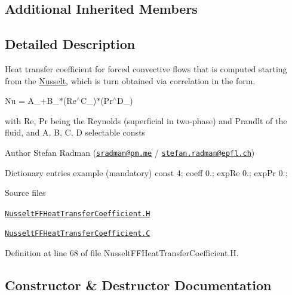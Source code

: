 \subsection*{Additional Inherited Members}


\subsection{Detailed Description}
Heat transfer coefficient for forced convective flows that is computed starting from the \hyperlink{classFoam_1_1FFHeatTransferCoefficientModels_1_1Nusselt}{Nusselt}, which is turn obtained via correlation in the form. 

\label{_Description}%
 Nu = A\+\_\++\+B\+\_\+$\ast$(Re$^\wedge$\+C\+\_\+)$\ast$(Pr$^\wedge$\+D\+\_\+)

with Re, Pr being the Reynolds (superficial in two-\/phase) and Prandlt of the fluid, and A, B, C, D selectable consts

Author Stefan Radman (\href{mailto:sradman@pm.me}{\tt sradman@pm.\+me} / \href{mailto:stefan.radman@epfl.ch}{\tt stefan.\+radman@epfl.\+ch})

Dictionary entries example (mandatory) const 4; coeff 0.; exp\+Re 0.; exp\+Pr 0.;

\begin{DoxyParagraph}{Source files}

\begin{DoxyItemize}
\item \href{../../../home/carlo/data/GeN-Foam/GeN-Foam_ffn/GeN-Foam/GeN-Foam/classes/thermalHydraulics/src/physicsModels/heatTransferModels/FFHeatTransferCoefficientModels/Nusselt/NusseltFFHeatTransferCoefficient.H}{\tt Nusselt\+F\+F\+Heat\+Transfer\+Coefficient.\+H} 
\item \href{../../../home/carlo/data/GeN-Foam/GeN-Foam_ffn/GeN-Foam/GeN-Foam/classes/thermalHydraulics/src/physicsModels/heatTransferModels/FFHeatTransferCoefficientModels/Nusselt/NusseltFFHeatTransferCoefficient.C}{\tt Nusselt\+F\+F\+Heat\+Transfer\+Coefficient.\+C} 
\end{DoxyItemize}
\end{DoxyParagraph}


Definition at line 68 of file Nusselt\+F\+F\+Heat\+Transfer\+Coefficient.\+H.



\subsection{Constructor \& Destructor Documentation}
\mbox{\label{classFoam_1_1FFHeatTransferCoefficientModels_1_1Nusselt_a809259339657615ee1b1342055870824}} 
